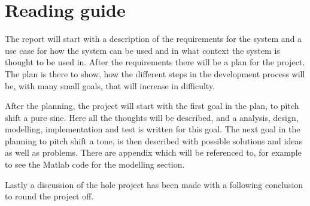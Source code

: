 
\chapter*{Reading guide}
The report will start with a description of the requirements for the system and a use case for how the system can be used and in what context the system is thought to be used in.
After the requirements there will be a plan for the project.
The plan is there to show, how the different steps in the development process will be, with many small goals, that will increase in difficulty.

After the planning, the project will start with the first goal in the plan, to pitch shift a pure sine. 
Here all the thoughts will be described, and a analysis, design, modelling, implementation and test is written for this goal. 
The next goal in the planning to pitch shift a tone, is then described with possible solutions and ideas as well as problems.
There are appendix which will be referenced to, for example to see the Matlab code for the modelling section. 

Lastly a discussion of the hole project has been made with a following conclusion to round the project off. 
